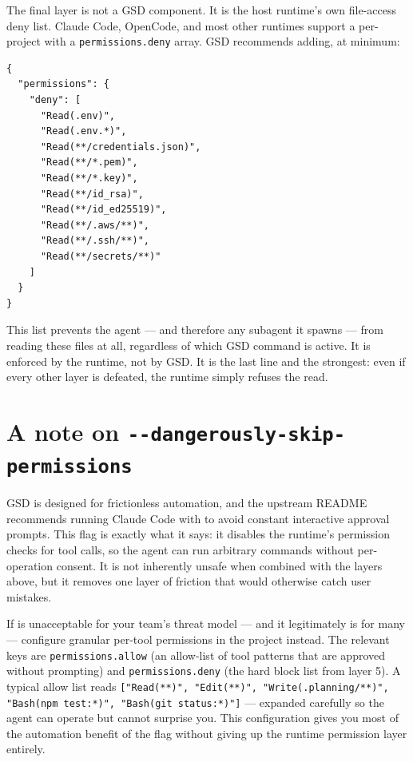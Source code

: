 \documentclass[11pt,letterpaper,openany]{book}
\begin{document}
The final layer is not a GSD component. It is the host runtime's own file-access deny list. Claude Code, OpenCode, and most other runtimes support a per-project  with a \texttt{permissions.deny} array. GSD recommends adding, at minimum:

\begin{lstlisting}
{
  "permissions": {
    "deny": [
      "Read(.env)",
      "Read(.env.*)",
      "Read(**/credentials.json)",
      "Read(**/*.pem)",
      "Read(**/*.key)",
      "Read(**/id_rsa)",
      "Read(**/id_ed25519)",
      "Read(**/.aws/**)",
      "Read(**/.ssh/**)",
      "Read(**/secrets/**)"
    ]
  }
}
\end{lstlisting}

This list prevents the agent — and therefore any subagent it spawns — from reading these files at all, regardless of which GSD command is active. It is enforced by the runtime, not by GSD. It is the last line and the strongest: even if every other layer is defeated, the runtime simply refuses the read.

\section{A note on \texttt{-{}-dangerously-skip-permissions}}

GSD is designed for frictionless automation, and the upstream README recommends running Claude Code with  to avoid constant interactive approval prompts. This flag is exactly what it says: it disables the runtime's permission checks for tool calls, so the agent can run arbitrary commands without per-operation consent. It is not inherently unsafe when combined with the layers above, but it removes one layer of friction that would otherwise catch user mistakes.

\begin{tcolorbox}[colback=gsdwarnbg,colframe=gsdwarnbar,title=\textbf{Granular alternative}]
If  is unacceptable for your team's threat model — and it legitimately is for many — configure granular per-tool permissions in the project  instead. The relevant keys are \texttt{permissions.allow} (an allow-list of tool patterns that are approved without prompting) and \texttt{permissions.deny} (the hard block list from layer 5). A typical allow list reads \texttt{["Read(**)", "Edit(**)", "Write(.planning/**)", "Bash(npm test:*)", "Bash(git status:*)"]} — expanded carefully so the agent can operate but cannot surprise you. This configuration gives you most of the automation benefit of the flag without giving up the runtime permission layer entirely.
\end{tcolorbox}
\end{document}
